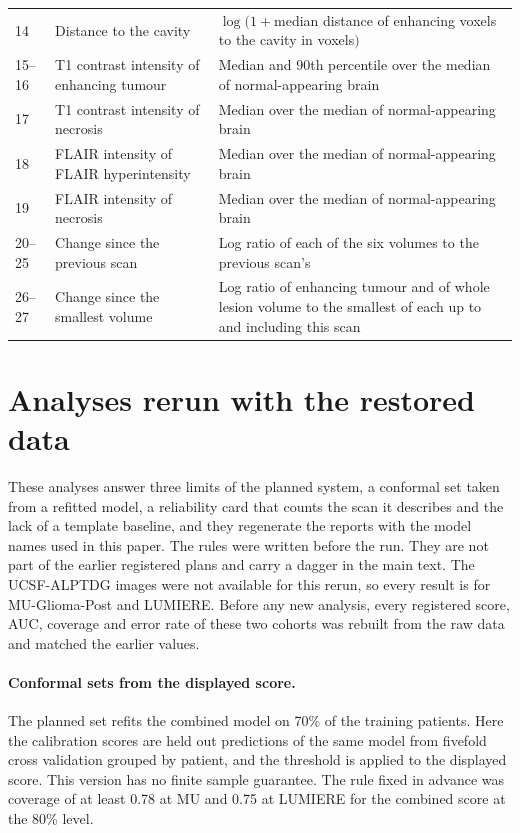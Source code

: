 \documentclass[11pt,a4paper]{article}
\begin{document}
\begin{table}[H]
\begin{tabularx}{\linewidth}{@{}R{0.6cm}R{4.6cm}L@{}}
14 & Distance to the cavity & $\log(1+{}$median distance of enhancing voxels to the cavity in voxels$)$ \\
15--16 & T1 contrast intensity of enhancing tumour & Median and 90th percentile over the median of normal-appearing brain \\
17 & T1 contrast intensity of necrosis & Median over the median of normal-appearing brain \\
18 & FLAIR intensity of FLAIR hyperintensity & Median over the median of normal-appearing brain \\
19 & FLAIR intensity of necrosis & Median over the median of normal-appearing brain \\
20--25 & Change since the previous scan & Log ratio of each of the six volumes to the previous scan's \\
26--27 & Change since the smallest volume & Log ratio of enhancing tumour and of whole lesion volume to the smallest of each up to and including this scan \\
\bottomrule
\end{tabularx}
\end{table}

\FloatBarrier
\section{Analyses rerun with the restored data}\label{sec:S25}

These analyses answer three limits of the planned system, a conformal set taken from a refitted model, a reliability
card that counts the scan it describes and the lack of a template baseline, and they regenerate the reports with the
model names used in this paper. The rules were written before the run. They are not part of the earlier
registered plans and carry a dagger in the main text. The UCSF-ALPTDG images were not available for this rerun, so
every result is for MU-Glioma-Post and LUMIERE. Before any new analysis, every registered score, AUC, coverage and
error rate of these two cohorts was rebuilt from the raw data and matched the earlier values.

\paragraph{Conformal sets from the displayed score.} The planned set refits the combined model on 70\% of the training
patients. Here the calibration scores are held out predictions of the same model from fivefold cross validation
grouped by patient, and the threshold is applied to the displayed score. This version has no finite sample guarantee.
The rule fixed in advance was coverage of at least 0.78 at MU and 0.75 at LUMIERE for the combined score at the 80\% level.
\end{document}

